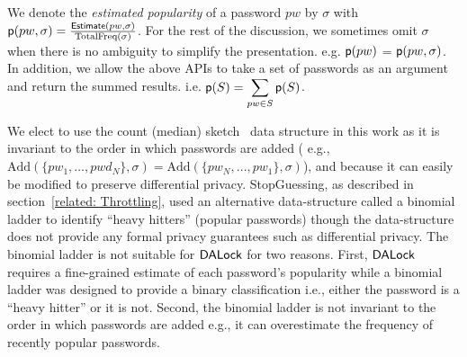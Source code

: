 We denote the \emph{estimated popularity} of a password $pw$ by $\sigma$ with $\textsf{p}(pw,\sigma) = \frac{\textsf{Estimate}(pw,\sigma)}{\text{TotalFreq}(\sigma)}$. For the rest of the discussion, we sometimes omit $\sigma$ when there is no ambiguity to simplify the presentation. e.g. $\textsf{p}(pw)$ = $\textsf{p}(pw,\sigma)$. In addition, we allow the above APIs to take a set of passwords as an argument and return the summed results. i.e. $\textsf{p}(S) = \displaystyle{\sum_{pw \in S} \textsf{p}(S)}$. 

 We elect to use the count (median) sketch~\cite{ICALP:ChaCheFar02} data structure in this work as it is invariant to the order in which passwords are added ( e.g., $\text{Add}(\{pw_1,\ldots,pwd_N\},\sigma) = \text{Add}(\{pw_N,\ldots, pw_1\},\sigma)$), and because it can easily be modified to preserve differential privacy. { StopGuessing\cite{EuroSP:THS19}, {as described in section~\ref{related: Throttling},} used an alternative data-structure called a binomial ladder to identify ``heavy hitters'' (popular passwords) though the data-structure does not provide any formal privacy guarantees such as differential privacy. The binomial ladder is not suitable for $\mathsf{DALock}$ for two reasons. First,  $\mathsf{DALock}$ requires a fine-grained estimate of each password's popularity while a binomial ladder was designed to provide a binary classification i.e., either the password is a ``heavy hitter'' or it is not. Second, the binomial ladder is not invariant to the order in which passwords are added e.g., it can overestimate the frequency of recently popular passwords. }





\vspace*{-\baselineskip}
\vspace*{-\baselineskip}
